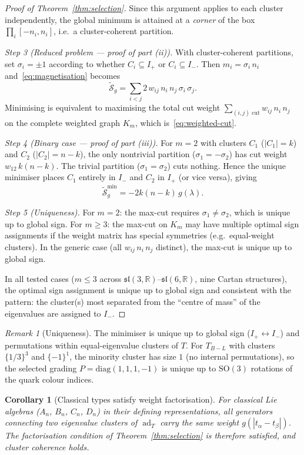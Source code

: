 \documentclass[11pt]{article}
\theoremstyle{plain}
\newtheorem{corollary}[theorem]{Corollary}
\theoremstyle{definition}
\theoremstyle{remark}
\newtheorem*{remark}{Remark}
\newcommand{\sln}[1]{\mathfrak{sl}(#1,\mathbb{R})}
\newcommand{\TBL}{T_{B\!-\!L}}
\newcommand{\ad}{\operatorname{ad}}
\begin{document}
\begin{proof}[Proof of Theorem~\ref{thm:selection}]
Since this argument applies to each cluster independently, the
global minimum is attained at a \emph{corner} of the box
$\prod_i [-n_i, n_i]$, i.e.\ a cluster-coherent partition.

\emph{Step 3 (Reduced problem --- proof of part (ii)).}
With cluster-coherent partitions, set $\sigma_i = \pm 1$ according
to whether $C_i \subseteq I_+$ or $C_i \subseteq I_-$.  Then
$m_i = \sigma_i\,n_i$ and~\eqref{eq:magnetisation} becomes
\[
  \widetilde{\mathcal{S}}_g
  = \sum_{i < j} 2\,w_{ij}\,n_i\,n_j\,\sigma_i\,\sigma_j.
\]
Minimising is equivalent to maximising the total cut weight
$\sum_{(i,j) \text{ cut}} w_{ij}\,n_i\,n_j$ on the complete weighted
graph $K_m$, which is~\eqref{eq:weighted-cut}.

\emph{Step 4 (Binary case --- proof of part (iii)).}
For $m = 2$ with clusters $C_1$ ($|C_1| = k$) and
$C_2$ ($|C_2| = n - k$), the only nontrivial partition
($\sigma_1 = -\sigma_2$) has cut weight $w_{12}\,k(n-k)$.
The trivial partition ($\sigma_1 = \sigma_2$) cuts nothing.
Hence the unique minimiser places $C_1$ entirely in $I_-$
and $C_2$ in $I_+$ (or vice versa), giving
\[
  \widetilde{\mathcal{S}}_g^{\min}
  = -2k(n{-}k)\,g(\lambda).
\]

\emph{Step 5 (Uniqueness).}
For $m = 2$: the max-cut requires $\sigma_1 \ne \sigma_2$, which
is unique up to global sign.  For $m \ge 3$: the max-cut on $K_m$
may have multiple optimal sign assignments if the weight matrix has
special symmetries (e.g.\ equal-weight clusters).  In the generic
case (all $w_{ij}\,n_i\,n_j$ distinct), the max-cut is unique up
to global sign.

In all tested cases ($m \le 3$ across $\sln{3}$--$\sln{6}$,
nine Cartan structures), the optimal sign assignment is unique
up to global sign and consistent with the pattern: the cluster(s)
most separated from the ``centre of mass'' of the eigenvalues
are assigned to $I_-$.
\qedhere
\end{proof}

\begin{remark}[Uniqueness]
The minimiser is unique up to global sign ($I_+ \leftrightarrow I_-$)
and permutations within equal-eigenvalue clusters of $T$.
For $\TBL$ with clusters $\{1/3\}^3$ and $\{-1\}^1$, the minority
cluster has size $1$ (no internal permutations), so the selected
grading $P = \mathrm{diag}(1,1,1,-1)$ is unique up to
$\mathrm{SO}(3)$ rotations of the quark colour indices.
\end{remark}

\begin{corollary}[Classical types satisfy weight factorisation]
\label{cor:classical}
For classical Lie algebras ($A_n$, $B_n$, $C_n$, $D_n$) in their
defining representations, all generators connecting two eigenvalue
clusters of $\ad_T$ carry the same weight $g(|t_\alpha - t_\beta|)$.
The factorisation condition of Theorem~\ref{thm:selection} is
therefore satisfied, and cluster coherence holds.
\end{corollary}
\end{document}
